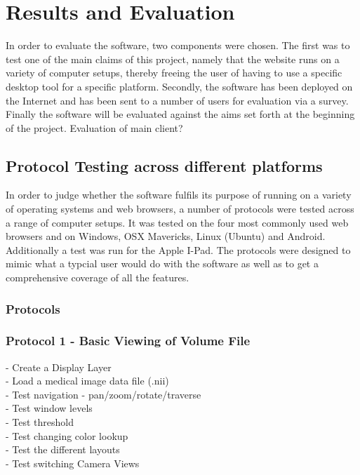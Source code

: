 \documentclass[a4paper,11pt,titlepage]{article}
\begin{document}
\section{Results and Evaluation}

In order to evaluate the software, two components were chosen. The first was to test one of the main claims of this project, namely that the website runs on a variety of computer setups, thereby freeing the user of having to use a specific desktop tool for a specific platform. Secondly, the software has been deployed on the Internet and has been sent to a number of users for evaluation via a survey. Finally the software will be evaluated against the aims set forth at the beginning of the project.
Evaluation of main client?


\subsection{Protocol Testing across different platforms}

In order to judge whether the software fulfils its purpose of running on a variety of operating systems and web browsers, a number of protocols were tested across a range of computer setups. It was tested on the four most commonly used web browsers and on Windows, OSX Mavericks, Linux (Ubuntu) and Android. Additionally a test was run for the Apple I-Pad. The protocols were designed to mimic what a typcial user would do with the software as well as to get a comprehensive coverage of all the features.


\subsubsection{Protocols}

\subsubsection*{Protocol 1 - Basic Viewing of Volume File }

- Create a Display Layer\\
- Load a medical image data file (.nii)\\
- Test navigation - pan/zoom/rotate/traverse\\
- Test window levels\\
- Test threshold\\
- Test changing color lookup\\
- Test the different layouts\\
- Test switching Camera Views
\end{document}
